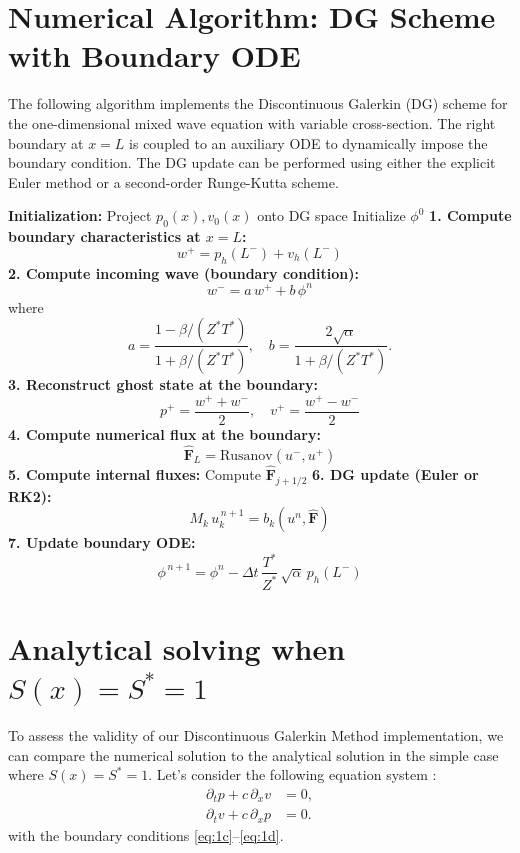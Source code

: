 \documentclass[11pt,a4paper]{report}
\theoremstyle{plain}
\theoremstyle{definition}
\begin{document}
\section{Numerical Algorithm: DG Scheme with Boundary ODE}

The following algorithm implements the Discontinuous Galerkin (DG) scheme 
for the one-dimensional mixed wave equation with variable cross-section. 
The right boundary at $x=L$ is coupled to an auxiliary ODE to dynamically 
impose the boundary condition. The DG update can be performed using either 
the explicit Euler method or a second-order Runge-Kutta scheme.

\begin{algorithm}[H]
\caption{DG scheme with boundary ODE at right boundary ($x=L$)}
\begin{algorithmic}[1]
\State \textbf{Initialization:}
\State \quad Project $p_0(x), v_0(x)$ onto DG space
\State \quad Initialize $\phi^0$
    \State \textbf{1. Compute boundary characteristics at $x=L$:}
    \[
        w^+ = p_h(L^-) + v_h(L^-)
    \]
    \State \textbf{2. Compute incoming wave (boundary condition):}
    \[
        w^- = a\, w^+ + b\, \phi^n
    \]
    where
    \[
        a = \frac{1 - \beta/(Z^* T^*)}{1 + \beta/(Z^* T^*)}, \quad
        b = \frac{2 \sqrt{\alpha}}{1 + \beta/(Z^* T^*)}.
    \]
    \State \textbf{3. Reconstruct ghost state at the boundary:}
    \[
        p^+ = \frac{w^+ + w^-}{2},\quad
        v^+ = \frac{w^+ - w^-}{2}
    \]
    \State \textbf{4. Compute numerical flux at the boundary:}
    \[
        \hat{\mathbf F}_L = \text{Rusanov}(u^-, u^+)
    \]
    \State \textbf{5. Compute internal fluxes:}
        \State Compute $\hat{\mathbf F}_{j+1/2}$
    \EndFor
    \State \textbf{6. DG update (Euler or RK2):}
    \[
        M_k \, u_k^{\,n+1} = b_k(u^n, \hat{\mathbf F})
    \]
    \State \textbf{7. Update boundary ODE:}
    \[
        \phi^{\,n+1} = \phi^n - \Delta t \, \frac{T^*}{Z^*} \, \sqrt{\alpha} \, p_h(L^-)
    \]
\EndFor
\end{algorithmic}
\end{algorithm}


\section{Analytical solving when $S(x) = S^* = 1$}
To assess the validity of our Discontinuous Galerkin Method implementation, we can compare the numerical solution to the analytical solution in the simple case where $S(x) = S^* = 1$.
Let's consider the following equation system :
\begin{align}
    \partial_t p + c\,\partial_x v &= 0, \\
    \partial_t v + c\,\partial_x p &= 0.
\end{align}
with the boundary conditions {\eqref{eq:1c}--\eqref{eq:1d}}. 
\end{document}
